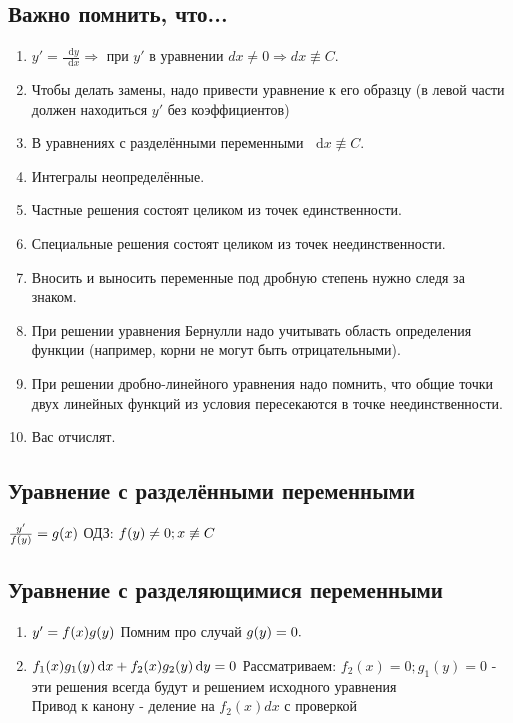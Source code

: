 \documentclass[12pt]{article}
\newcommand*\diff{\mathop{}\!\mathrm{d}}
\begin{document}
\subsection{Важно помнить, что...}
\begin{enumerate}
\item $y' = \frac{\diff y}{\diff x} \Rightarrow $ при $y'$ в уравнении $dx \neq 0 \Rightarrow dx \not\equiv C$.
\item Чтобы делать замены, надо привести уравнение к его образцу (в левой части должен находиться $y'$ без коэффициентов) 
\item В уравнениях с разделёнными переменными $\diff x \not\equiv C$.
\item Интегралы неопределённые.
\item Частные решения состоят целиком из точек единственности.
\item Специальные решения состоят целиком из точек неединственности.
\item Вносить и выносить переменные под дробную степень нужно следя за знаком.
\item При решении уравнения Бернулли надо учитывать область определения функции (например, корни не могут быть отрицательными).
\item При решении дробно-линейного уравнения надо помнить, что общие точки двух линейных функций из условия пересекаются в точке неединственности.
\item Вас отчислят.
\end{enumerate}


\subsection{Уравнение с разделёнными переменными}
$\frac{y'}{f(y)} = g(x) \\$
ОДЗ: $f(y) \neq 0; x \not\equiv C\\$
\subsection{Уравнение с разделяющимися переменными}


\begin{enumerate}
\item $y' = f(x)g(y) \\ $
Помним про случай $g(y) = 0 .\\$ 
\item $f_1(x)g_1(y) \diff x + f_2(x) g_2(y) \diff y = 0 \\$
Рассматриваем: $f_2(x) = 0;g_1(y) = 0$ - эти решения всегда будут и решением исходного уравнения\\
Привод к канону - деление на $f_2(x)dx$ с проверкой
\end{enumerate}
\end{document}
